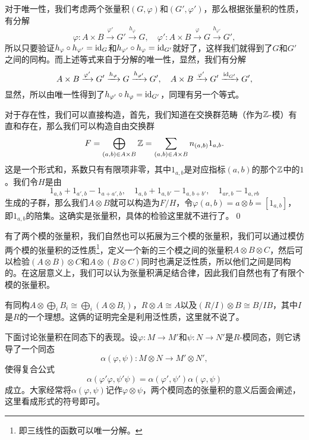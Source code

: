 \proof 对于唯一性，我们考虑两个张量积$(G,\varphi)$和$(G',\varphi')$，那么根据张量积的性质，有分解
\[
	\varphi:A\times B\xrightarrow{\varphi'} G'\xrightarrow{h_{\varphi}}G,\quad \varphi':A\times B\xrightarrow{\varphi} G\xrightarrow{h_{\varphi'}}G',
\]
所以只要验证$h_\varphi\circ h_{\varphi'}=\operatorname{id}_{G}$和$h_{\varphi'}\circ h_{\varphi}=\operatorname{id}_{G'}$就好了，这样我们就得到了$G$和$G'$之间的同构。而上述等式来自于分解的唯一性，显然，我们有分解
\[
	A\times B\xrightarrow{\varphi'} G'\xrightarrow{h_{\varphi}}G\xrightarrow{h_{\varphi'}}G',\quad A\times B\xrightarrow{\varphi'} G'\xrightarrow{\operatorname{id}_{G'}}G',
\]
显然，所以由唯一性得到了$h_{\varphi'}\circ h_{\varphi}=\operatorname{id}_{G'}$，同理有另一个等式。

对于存在性，我们可以直接构造，首先，我们知道在交换群范畴（作为$\mathbb{Z}$-模）有直和存在，那么我们可以构造自由交换群
\[
	F=\bigoplus_{(a,b)\in A\times B} \mathbb{Z}=\sum_{(a,b)\in A\times B}n_{(a,b)}1_{a,b}.
\]
这是一个形式和，系数只有有限项非零，其中$1_{a,b}$是对应指标$(a,b)$的那个$\mathbb{Z}$中的$1$。我们令$H$是由
\[
	1_{a,b}+1_{a',b}-1_{a+a',b},\quad 1_{a,b}+1_{a,b'}-1_{a,b+b'},\quad 1_{ar,b}-1_{a,rb}
\]
生成的子群，那么我们$A\otimes B$就可以构造为$F/H$，令$\varphi(a,b)=a\otimes b=[1_{a,b}]$，即$1_{a,b}$的陪集。这确实是张量积，具体的检验这里就不进行了。\qed


\para 有了两个模的张量积，我们自然也可以拓展为三个模的张量积，我们可以通过模仿两个模的张量积的泛性质\footnote{即三线性的函数可以唯一分解。}，定义一个新的三个模之间的张量积$A\otimes B\otimes C$，然后可以检验$(A\otimes B)\otimes C$和$A\otimes (B\otimes C)$同时也满足泛性质，所以他们之间是同构的。在这层意义上，我们可以认为张量积满足结合律，因此我们自然也有了有限个模的张量积。

\para 有同构$A\otimes\bigoplus_i B_i\cong \bigoplus_i (A\otimes B_i)$，$R\otimes A\cong A$以及$(R/I)\otimes B\cong B/IB$，其中$I$是$R$的一个理想。这俩的证明完全是利用泛性质，这里就不说了。

\para 下面讨论张量积在同态下的表现。设$\varphi:M\to M'$和$\psi:N\to N'$是$R$-模同态，则它诱导了一个同态
\[
	\alpha(\varphi,\psi):M\otimes N\to M'\otimes N',
\]
使得复合公式
\[
	\alpha(\varphi'\varphi,\psi'\psi)=\alpha(\varphi',\psi')\alpha(\varphi,\psi)
\]
成立。大家经常将$\alpha(\varphi,\psi)$记作$\varphi\otimes \psi$，两个模同态的张量积的意义后面会阐述，这里看成形式的符号即可。

